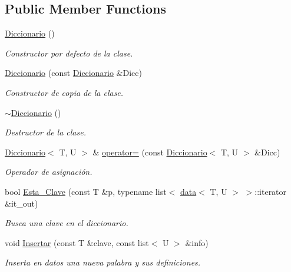 \subsection*{Public Member Functions}
\begin{DoxyCompactItemize}
\item 
\hyperlink{classDiccionario_adad32f7bfd34b7a8631ff5f26033b369}{Diccionario} ()
\begin{DoxyCompactList}\small\item\em Constructor por defecto de la clase. \end{DoxyCompactList}\item 
\hyperlink{classDiccionario_aec12a6b43434389d8e244bb85db29149}{Diccionario} (const \hyperlink{classDiccionario}{Diccionario} \&Dicc)
\begin{DoxyCompactList}\small\item\em Constructor de copia de la clase. \end{DoxyCompactList}\item 
\mbox{\label{classDiccionario_a006b21559ae7e1b449c785fc47dfb04d}} 
\hyperlink{classDiccionario_a006b21559ae7e1b449c785fc47dfb04d}{$\sim$\+Diccionario} ()
\begin{DoxyCompactList}\small\item\em Destructor de la clase. \end{DoxyCompactList}\item 
\hyperlink{classDiccionario}{Diccionario}$<$ T, U $>$ \& \hyperlink{classDiccionario_a8ddaa4d3ff7ae725feaecc47a386094b}{operator=} (const \hyperlink{classDiccionario}{Diccionario}$<$ T, U $>$ \&Dicc)
\begin{DoxyCompactList}\small\item\em Operador de asignación. \end{DoxyCompactList}\item 
bool \hyperlink{classDiccionario_aed08682f43af8f4537c6a88211bb225a}{Esta\+\_\+\+Clave} (const T \&p, typename list$<$ \hyperlink{structdata}{data}$<$ T, U $>$ $>$\+::iterator \&it\+\_\+out)
\begin{DoxyCompactList}\small\item\em Busca una clave en el diccionario. \end{DoxyCompactList}\item 
void \hyperlink{classDiccionario_af520b73907852cc8002260ddf9fb822c}{Insertar} (const T \&clave, const list$<$ U $>$ \&info)
\begin{DoxyCompactList}\small\item\em Inserta en datos una nueva palabra y sus definiciones. \end{DoxyCompactList}\item 

\end{DoxyCompactItemize}
